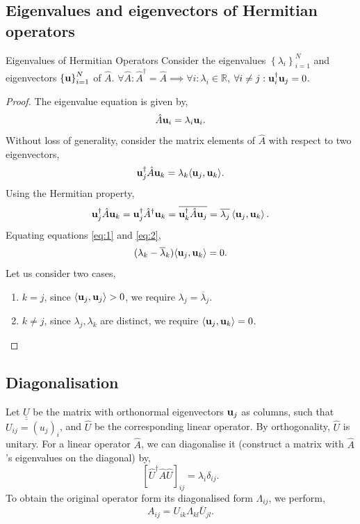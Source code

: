 \documentclass{book}
\def\innerproduct#1#2{{\langle #1},{#2 \rangle}}
\def\doubleunderline#1{\underline{\underline{#1}}}
\begin{document}
\subsection{Eigenvalues and eigenvectors of Hermitian operators}
\begin{Theorems}{Eigenvalues of Hermitian Operators}{}
	Consider the eigenvalues $\left\{\lambda_i\right\}_{i=1}^N$ and eigenvectors $\left\{\vb{u}\right\}_{i=1}^N$ of $\hat{A}$. $\forall \hat{A} : \hat{A}^{\dag} = \hat{A} \implies \forall i: \lambda_i \in \mathbb{R}$, $\forall i\neq j: \vb{u}_i^{\dag}\vb{u}_j = 0$.
\end{Theorems}
\begin{proof}
	The eigenvalue equation is given by,
	\begin{equation}
		\hat{A}\vb{u}_i = \lambda_i \vb{u}_i.
	\end{equation}
	Without loss of generality, consider the matrix elements of $\hat{A}$ with respect to two eigenvectors,
	\begin{equation}
		\vb{u}_j^{\dag}\hat{A}\vb{u}_k = \lambda_k\innerproduct{\vb{u}_j}{\vb{u}_k}. \label{eq:1}
	\end{equation}
	Using the Hermitian property,
	\begin{equation}
		\vb{u}_j^{\dag}\hat{A}\vb{u}_k = \vb{u}_j^{\dag}\hat{A}^{\dag}\vb{u}_k = \overline{\vb{u}_k^{\dag}\hat{A}\vb{u}_j} = \overline{\lambda_j}\left<\vb{u}_j, \vb{u}_k\right>. \label{eq:2}
	\end{equation}
	Equating equations \eqref{eq:1} and \eqref{eq:2},
	\begin{equation}
		(\lambda_k - \overline{\lambda}_k)\innerproduct{\vb{u}_j}{\vb{u}_k} = 0.
	\end{equation}
	Let us consider two cases,
	\begin{enumerate}
		\item $k = j$, since $\innerproduct{\vb{u}_j}{\vb{u}_j} > 0$, we require $\lambda_j = \overline{\lambda}_j$. 
		\item $k\neq j$, since $\lambda_j, \lambda_k$ are distinct, we require $\innerproduct{\vb{u}_j}{\vb{u}_k} = 0$. 
	\end{enumerate}
\end{proof}
\subsection{Diagonalisation}
Let $\doubleunderline{U}$ be the matrix with orthonormal eigenvectors $\vb{u}_j$ as columns, such that $U_{ij} = (u_j)_i$, and $\hat{U}$ be the corresponding linear operator. By orthogonality, $\hat{U}$ is unitary. For a linear operator $\hat{A}$, we can diagonalise it (construct a matrix with $\hat{A}$'s eigenvalues on the diagonal) by,
\begin{equation}
	\left[\hat{U}^{\dag}\hat{A}\hat{U}\right]_{ij} = \lambda_i\delta_{ij}.
\end{equation}
To obtain the original operator form its diagonalised form $\Lambda_{ij}$, we perform,
\begin{equation}
	A_{ij} = U_{ik}\Lambda_{kl}\overline{U}_{jl}.
\end{equation}
\end{document}
